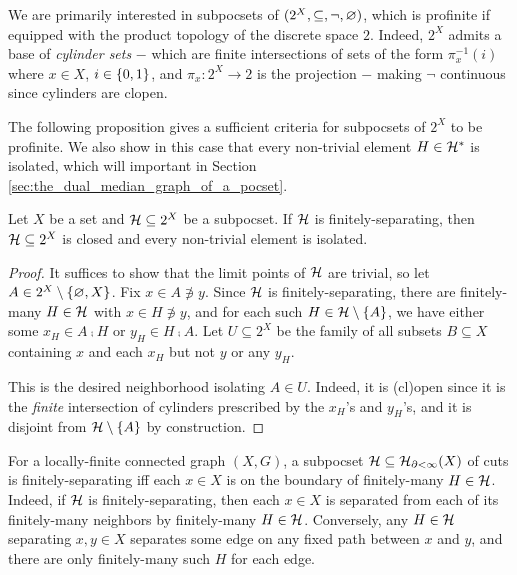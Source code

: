 \documentclass{amsart}
\begin{document}
    We are primarily interested in subpocsets of $(2^X,\subseteq,\lnot,\em)$, which is profinite if equipped with the product topology of the discrete space $2$. Indeed, $2^X$ admits a base of \textit{cylinder sets} $-$ which are finite intersections of sets of the form $\pi^{-1}_x(i)$ where $x\in X$, $i\in\l\{0,1\r\}$, and $\pi_x:2^X\to2$ is the projection $-$ making $\lnot$ continuous since cylinders are clopen. {\color{red}{Show that it is totally order-disconnected.}}

    The following proposition gives a sufficient criteria for subpocsets of $2^X$ to be profinite. We also show in this case that every non-trivial element $H\in\mc{H}^\ast$ is isolated, which will important in Section \ref{sec:the_dual_median_graph_of_a_pocset}.

    \begin{proposition}\label{prp:finitely-separating_non-trivial_isolated}
        Let $X$ be a set and $\mc{H}\subseteq2^X$ be a subpocset. If $\mc{H}$ is finitely-separating, then $\mc{H}\subseteq2^X$ is closed and every non-trivial element is isolated.
    \end{proposition}
    \begin{proof}
        It suffices to show that the limit points of $\mc{H}$ are trivial, so let $A\in2^X\comp\l\{\em,X\r\}$. Fix $x\in A\not\ni y$. Since $\mc{H}$ is finitely-separating, there are finitely-many $H\in\mc{H}$ with $x\in H\not\ni y$, and for each such $H\in\mc{H}\comp\l\{A\r\}$, we have either some $x_H\in A\comp H$ or $y_H\in H\comp A$. Let $U\subseteq2^X$ be the family of all subsets $B\subseteq X$ containing $x$ and each $x_H$ but not $y$ or any $y_H$.

        This is the desired neighborhood isolating $A\in U$. Indeed, it is (cl)open since it is the \textit{finite} intersection of cylinders prescribed by the $x_H$'s and $y_H$'s, and it is disjoint from $\mc{H}\comp\l\{A\r\}$ by construction.
    \end{proof}

    For a locally-finite connected graph $(X,G)$, a subpocset $\mc{H}\subseteq\mc{H}_{\del<\infty}(X)$ of cuts is finitely-separating iff each $x\in X$ is on the boundary of finitely-many $H\in\mc{H}$. Indeed, if $\mc{H}$ is finitely-separating, then each $x\in X$ is separated from each of its finitely-many neighbors by finitely-many $H\in\mc{H}$. Conversely, any $H\in\mc{H}$ separating $x,y\in X$ separates some edge on any fixed path between $x$ and $y$, and there are only finitely-many such $H$ for each edge.
\end{document}

